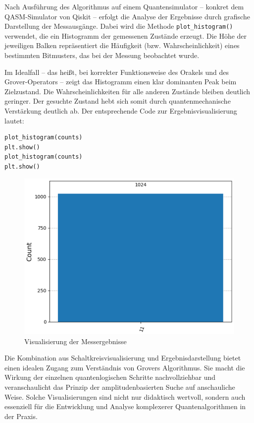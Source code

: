 Nach Ausführung des Algorithmus auf einem Quantensimulator – konkret dem QASM-Simulator von Qiskit – erfolgt die Analyse der Ergebnisse durch grafische Darstellung der Messausgänge.  Dabei wird die Methode \texttt{plot\_histogram()} verwendet, die ein Histogramm der gemessenen Zustände erzeugt.  Die Höhe der jeweiligen Balken repräsentiert die Häufigkeit (bzw. Wahrscheinlichkeit) eines bestimmten Bitmusters, das bei der Messung beobachtet wurde. 

Im Idealfall – das heißt, bei korrekter Funktionsweise des Orakels und des Grover-Operators – zeigt das Histogramm einen klar dominanten Peak beim Zielzustand.  Die Wahrscheinlichkeiten für alle anderen Zustände bleiben deutlich geringer.  Der gesuchte Zustand hebt sich somit durch quantenmechanische Verstärkung deutlich ab.  Der entsprechende Code zur Ergebnisvisualisierung lautet: 
\begin{verbatim}
plot_histogram(counts)
plt.show()
plot_histogram(counts)
plt.show()
\end{verbatim}

\begin{figure}
    \centering
    \includegraphics[width=1\linewidth]{Visualisierung der Messergebnisse.png}
    \caption{Visualisierung der Messergebnisse}
    \label{fig:enter-label}
\end{figure}

Die Kombination aus Schaltkreisvisualisierung und Ergebnisdarstellung bietet einen idealen Zugang zum Verständnis von Grovers Algorithmus.  Sie macht die Wirkung der einzelnen quantenlogischen Schritte nachvollziehbar und veranschaulicht das Prinzip der amplitudenbasierten Suche auf anschauliche Weise.  Solche Visualisierungen sind nicht nur didaktisch wertvoll, sondern auch essenziell für die Entwicklung und Analyse komplexerer Quantenalgorithmen in der Praxis. 

